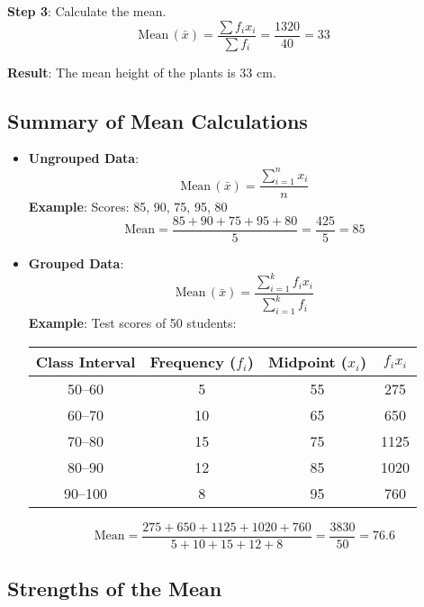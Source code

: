 \documentclass[11pt]{article}
\begin{document}
\textbf{Step 3}: Calculate the mean.
\[
\text{Mean} \, (\bar{x}) = \frac{\sum f_i x_i}{\sum f_i} = \frac{1320}{40} = 33
\]

\textbf{Result}: The mean height of the plants is 33 cm.

\subsection*{Summary of Mean Calculations}

\begin{itemize}
    \item \textbf{Ungrouped Data}:
    \[
    \text{Mean} \, (\bar{x}) = \frac{\sum_{i=1}^{n}x_i}{n}
    \]
    \textbf{Example}: Scores: 85, 90, 75, 95, 80
    \[
    \text{Mean} = \frac{85 + 90 + 75 + 95 + 80}{5} = \frac{425}{5} = 85
    \]

    \item \textbf{Grouped Data}:
    \[
    \text{Mean} \, (\bar{x}) = \frac{\sum_{i=1}^{k}f_i x_i}{\sum_{i=1}^{k}f_i}
    \]
    \textbf{Example}: Test scores of 50 students:

    \begin{center}
    \begin{tabular}{|c|c|c|c|}
    \hline
    \textbf{Class Interval} & \textbf{Frequency} ($f_i$) & \textbf{Midpoint} ($x_i$) & $f_i x_i$ \\
    \hline
    50--60 & 5 & 55 & 275 \\
    60--70 & 10 & 65 & 650 \\
    70--80 & 15 & 75 & 1125 \\
    80--90 & 12 & 85 & 1020 \\
    90--100 & 8 & 95 & 760 \\
    \hline
    \end{tabular}
    \end{center}

    \[
    \text{Mean} = \frac{275 + 650 + 1125 + 1020 + 760}{5 + 10 + 15 + 12 + 8} = \frac{3830}{50} = 76.6
    \]
\end{itemize}

\subsection*{Strengths of the Mean}
\end{document}
